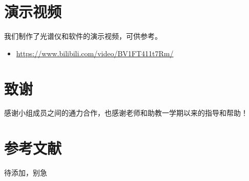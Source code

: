 \documentclass[UTF8]{article}
\begin{document}
	\section{演示视频}
	我们制作了光谱仪和软件的演示视频，可供参考。
	\begin{itemize}
		\item \url{https://www.bilibili.com/video/BV1FT411t7Rm/}
	\end{itemize}
	

	\section{致谢}
	感谢小组成员之间的通力合作，也感谢老师和助教一学期以来的指导和帮助！
	
	\section{参考文献}
	待添加，别急

	
	


	
\end{document}
